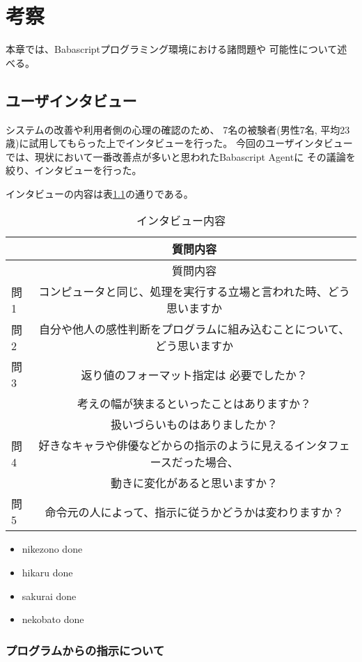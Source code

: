 \chapter{考察}\label{chap:discussion}

本章では、Babascriptプログラミング環境における諸問題や
可能性について述べる。

\section{ユーザインタビュー}\label{ux30e6ux30fcux30b6ux30a4ux30f3ux30bfux30d3ux30e5ux30fc}

システムの改善や利用者側の心理の確認のため、 7名の被験者(男性7名,
平均23歳)に試用してもらった上でインタビューを行った。
今回のユーザインタビューでは、現状において一番改善点が多いと思われたBabascript
Agentに その議論を絞り、インタビューを行った。

インタビューの内容は表\ref{table:interview}の通りである。

\begin{longtable}[c]{@{}lc@{}}
\caption{インタビュー内容 \label{table:interview}}\tabularnewline
\toprule
& 質問内容\tabularnewline
\midrule
\endfirsthead
\toprule
& 質問内容\tabularnewline
\midrule
\endhead
問1 &
コンピュータと同じ、処理を実行する立場と言われた時、どう思いますか\tabularnewline
問2 &
自分や他人の感性判断をプログラムに組み込むことについて、どう思いますか\tabularnewline
問3 & 返り値のフォーマット指定は 必要でしたか？ \tabularnewline
& 考えの幅が狭まるといったことはありますか？ \tabularnewline
& 扱いづらいものはありましたか？\tabularnewline
問4 &
好きなキャラや俳優などからの指示のように見えるインタフェースだった場合、\tabularnewline
& 動きに変化があると思いますか？\tabularnewline
問5 &
命令元の人によって、指示に従うかどうかは変わりますか？\tabularnewline
\bottomrule
\end{longtable}

\begin{itemize}
\itemsep1pt\parskip0pt
\item
  nikezono done
\item
  hikaru done
\item
  sakurai done
\item
  nekobato done
\end{itemize}

\subsection{プログラムからの指示について}\label{ux30d7ux30edux30b0ux30e9ux30e0ux304bux3089ux306eux6307ux793aux306bux3064ux3044ux3066}

